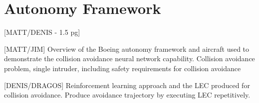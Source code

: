\section{Autonomy Framework}

[MATT/DENIS - 1.5 pg]

[MATT/JIM] Overview of the Boeing autonomy framework and aircraft used to demonstrate the collision avoidance neural network capability.
Collision avoidance problem, single intruder, including safety requirements for collision avoidance

[DENIS/DRAGOS] Reinforcement learning approach and the LEC produced for collision avoidance.  
Produce avoidance trajectory  by executing LEC repetitively. 
